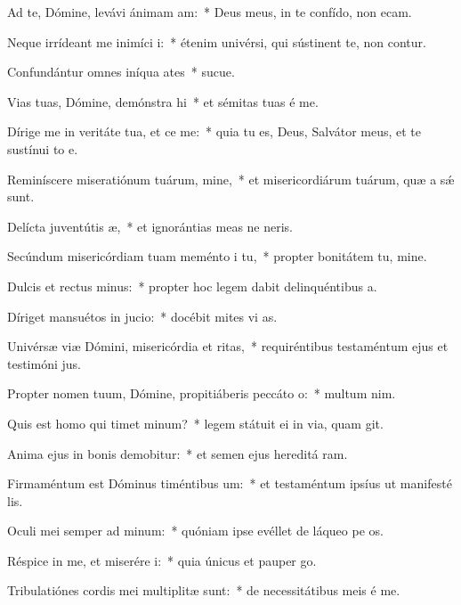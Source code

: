 \item Ad te, Dómine, levávi ánimam am:~* Deus meus, in te confído, non ecam.
\item Neque irrídeant me inimíci i:~* étenim univérsi, qui sústinent te, non contur.
\item Confundántur omnes iníqua ates~* sucue.
\item Vias tuas, Dómine, demónstra hi~* et sémitas tuas é me.
\item Dírige me in veritáte tua, et ce me:~* quia tu es, Deus, Salvátor meus, et te sustínui to e.
\item Reminíscere miseratiónum tuárum, mine,~* et misericordiárum tuárum, quæ a sǽ sunt.
\item Delícta juventútis æ,~* et ignorántias meas ne neris.
\item Secúndum misericórdiam tuam meménto i tu,~* propter bonitátem tu, mine.
\item Dulcis et rectus minus:~* propter hoc legem dabit delinquéntibus  a.
\item Díriget mansuétos in jucio:~* docébit mites vi as.
\item Univérsæ viæ Dómini, misericórdia et ritas,~* requiréntibus testaméntum ejus et testimóni jus.
\item Propter nomen tuum, Dómine, propitiáberis peccáto o:~* multum  nim.
\item Quis est homo qui timet minum?~* legem státuit ei in via, quam git.
\item Anima ejus in bonis demobitur:~* et semen ejus hereditá ram.
\item Firmaméntum est Dóminus timéntibus um:~* et testaméntum ipsíus ut manifesté lis.
\item Oculi mei semper ad minum:~* quóniam ipse evéllet de láqueo pe os.
\item Réspice in me, et miserére i:~* quia únicus et pauper  go.
\item Tribulatiónes cordis mei multiplitæ sunt:~* de necessitátibus meis é me.
